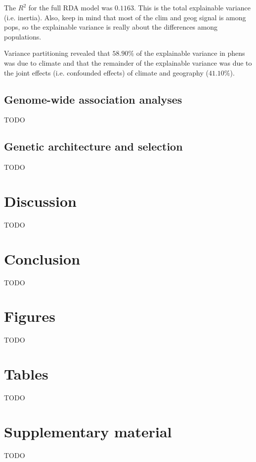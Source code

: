 \documentclass[fleqn,11pt]{wlpeerj}
\begin{document}
The $R^{2}$ for the full RDA model was $0.1163$. This is the total explainable variance (i.e. inertia).
Also, keep in mind that most of the clim and geog signal is among pops, so the
explainable variance is really about the differences among populations.

Variance partitioning revealed that $58.90\%$ of the explainable variance in phens
was due to climate and that the remainder of the explainable variance was due to
the joint effects (i.e. confounded effects) of climate and geography ($41.10\%$).

\subsection*{Genome-wide association analyses}
TODO

\subsection*{Genetic architecture and selection}
TODO

\section*{Discussion}
TODO


\section*{Conclusion}
TODO


\section*{Figures}
TODO

\section*{Tables}
TODO

\section*{Supplementary material}
TODO

\clearpage

\end{document}
